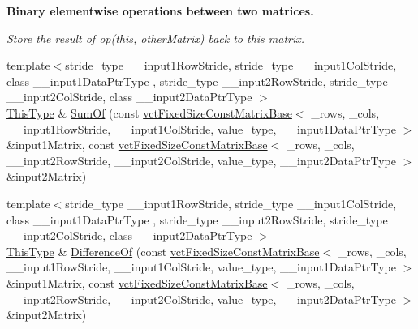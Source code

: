 \begin{Indent}{\bf Binary elementwise operations between two matrices.}\par
{\em Store the result of op(this, other\-Matrix) back to this matrix. }\begin{DoxyCompactItemize}
\item 
{\footnotesize template$<$stride\-\_\-type \-\_\-\-\_\-input1\-Row\-Stride, stride\-\_\-type \-\_\-\-\_\-input1\-Col\-Stride, class \-\_\-\-\_\-input1\-Data\-Ptr\-Type , stride\-\_\-type \-\_\-\-\_\-input2\-Row\-Stride, stride\-\_\-type \-\_\-\-\_\-input2\-Col\-Stride, class \-\_\-\-\_\-input2\-Data\-Ptr\-Type $>$ }\\\hyperlink{classvct_fixed_size_const_matrix_base_a7ec66a96ed7e08ce9ff54093133c9d8d}{This\-Type} \& \hyperlink{classvct_fixed_size_matrix_base_a487cb1e2640869958179238849ef3758}{Sum\-Of} (const \hyperlink{classvct_fixed_size_const_matrix_base}{vct\-Fixed\-Size\-Const\-Matrix\-Base}$<$ \-\_\-rows, \-\_\-cols, \-\_\-\-\_\-input1\-Row\-Stride, \-\_\-\-\_\-input1\-Col\-Stride, value\-\_\-type, \-\_\-\-\_\-input1\-Data\-Ptr\-Type $>$ \&input1\-Matrix, const \hyperlink{classvct_fixed_size_const_matrix_base}{vct\-Fixed\-Size\-Const\-Matrix\-Base}$<$ \-\_\-rows, \-\_\-cols, \-\_\-\-\_\-input2\-Row\-Stride, \-\_\-\-\_\-input2\-Col\-Stride, value\-\_\-type, \-\_\-\-\_\-input2\-Data\-Ptr\-Type $>$ \&input2\-Matrix)
\item 
{\footnotesize template$<$stride\-\_\-type \-\_\-\-\_\-input1\-Row\-Stride, stride\-\_\-type \-\_\-\-\_\-input1\-Col\-Stride, class \-\_\-\-\_\-input1\-Data\-Ptr\-Type , stride\-\_\-type \-\_\-\-\_\-input2\-Row\-Stride, stride\-\_\-type \-\_\-\-\_\-input2\-Col\-Stride, class \-\_\-\-\_\-input2\-Data\-Ptr\-Type $>$ }\\\hyperlink{classvct_fixed_size_const_matrix_base_a7ec66a96ed7e08ce9ff54093133c9d8d}{This\-Type} \& \hyperlink{classvct_fixed_size_matrix_base_a905ade9ecaf1d84adc0a539b2b212c91}{Difference\-Of} (const \hyperlink{classvct_fixed_size_const_matrix_base}{vct\-Fixed\-Size\-Const\-Matrix\-Base}$<$ \-\_\-rows, \-\_\-cols, \-\_\-\-\_\-input1\-Row\-Stride, \-\_\-\-\_\-input1\-Col\-Stride, value\-\_\-type, \-\_\-\-\_\-input1\-Data\-Ptr\-Type $>$ \&input1\-Matrix, const \hyperlink{classvct_fixed_size_const_matrix_base}{vct\-Fixed\-Size\-Const\-Matrix\-Base}$<$ \-\_\-rows, \-\_\-cols, \-\_\-\-\_\-input2\-Row\-Stride, \-\_\-\-\_\-input2\-Col\-Stride, value\-\_\-type, \-\_\-\-\_\-input2\-Data\-Ptr\-Type $>$ \&input2\-Matrix)
\item 

\end{DoxyCompactItemize}
\end{Indent}
